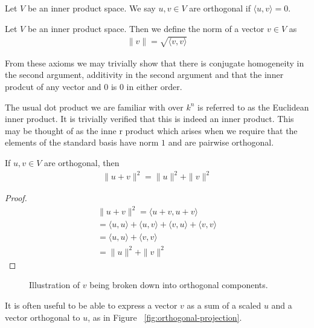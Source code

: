 \documentclass[]{article}
\begin{document}
\begin{defi} [Orthogonality]
	Let $V$ be an inner product space. We say $u,v \in V$ are orthogonal if $\langle u, v \rangle = 0$.
\end{defi}

\begin{defi} [Norm]
	Let $V$ be an inner product space. Then we define the norm of a vector $v \in V$ as
	\begin{align*}
			\|v\| =  \sqrt{\langle v, v \rangle }
	\end{align*}
\end{defi}

From these axioms we may trivially show that there is conjugate homogeneity in the second argument, additivity in the second argument and that the inner prodcut of any vector and $0$ is $0$ in either order.

The usual dot product we are familiar with over $k^n$ is referred to as the Euclidean inner product. It is trivially verified that this is indeed an inner product. This may be thought of as the inne r product which arises when we require that the elements of the standard basis have norm $1$ and are pairwise orthogonal.

\begin{thm} 
	If $u,v \in V$ are orthogonal, then 
	\begin{align*}
	\|u+v\|^2 = \|u\|^2 + \|v\|^2
	\end{align*}
\end{thm}

\begin{proof}
		\begin{align*}
				\|u+v\|^2 = \langle u+v, u+v \rangle \\
				= \langle u, u \rangle + \langle u, v \rangle + \langle v, u \rangle + \langle v, v \rangle \\
				= \langle u, u \rangle  + \langle v, v \rangle \\
				= \|u\|^2 + \|v\|^2
		\end{align*}
\end{proof}

\begin{figure}[ht]
\centering
{}
\caption{Illustration of $v$ being broken down into orthogonal components.}
\label{fig:orthogonal-decomposition}
\end{figure}

It is often useful to be able to express a vector $v$ as a sum of a scaled $u$ and a vector orthogonal to $u$, as in Figure ~\ref{fig:orthogonal-projection}. 
\end{document}
